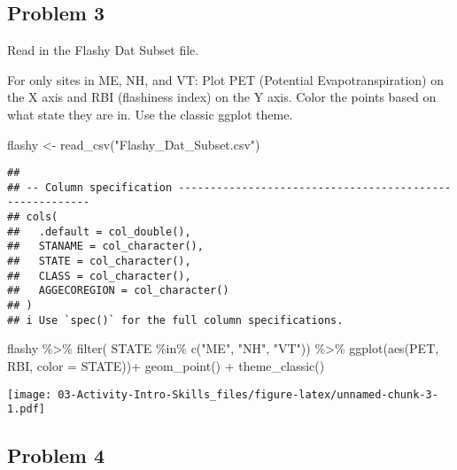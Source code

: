 \documentclass[
]{article}
\newenvironment{Shaded}{\begin{snugshade}}{\end{snugshade}}
\newcommand{\AttributeTok}[1]{\textcolor[rgb]{0.77,0.63,0.00}{#1}}
\newcommand{\FunctionTok}[1]{\textcolor[rgb]{0.00,0.00,0.00}{#1}}
\newcommand{\NormalTok}[1]{#1}
\newcommand{\OtherTok}[1]{\textcolor[rgb]{0.56,0.35,0.01}{#1}}
\newcommand{\SpecialCharTok}[1]{\textcolor[rgb]{0.00,0.00,0.00}{#1}}
\newcommand{\StringTok}[1]{\textcolor[rgb]{0.31,0.60,0.02}{#1}}
\begin{document}
\hypertarget{problem-3}{%
\subsection{Problem 3}\label{problem-3}}

Read in the Flashy Dat Subset file.

For only sites in ME, NH, and VT: Plot PET (Potential
Evapotranspiration) on the X axis and RBI (flashiness index) on the Y
axis. Color the points based on what state they are in. Use the classic
ggplot theme.

\begin{Shaded}
\begin{Highlighting}[]
\NormalTok{flashy }\OtherTok{\textless{}{-}} \FunctionTok{read\_csv}\NormalTok{(}\StringTok{"Flashy\_Dat\_Subset.csv"}\NormalTok{)}
\end{Highlighting}
\end{Shaded}

\begin{verbatim}
## 
## -- Column specification --------------------------------------------------------
## cols(
##   .default = col_double(),
##   STANAME = col_character(),
##   STATE = col_character(),
##   CLASS = col_character(),
##   AGGECOREGION = col_character()
## )
## i Use `spec()` for the full column specifications.
\end{verbatim}

\begin{Shaded}
\begin{Highlighting}[]
\NormalTok{flashy }\SpecialCharTok{\%\textgreater{}\%}
  \FunctionTok{filter}\NormalTok{( STATE }\SpecialCharTok{\%in\%} \FunctionTok{c}\NormalTok{(}\StringTok{"ME"}\NormalTok{, }\StringTok{"NH"}\NormalTok{, }\StringTok{"VT"}\NormalTok{)) }\SpecialCharTok{\%\textgreater{}\%}
  \FunctionTok{ggplot}\NormalTok{(}\FunctionTok{aes}\NormalTok{(PET, RBI, }\AttributeTok{color =}\NormalTok{ STATE))}\SpecialCharTok{+}
  \FunctionTok{geom\_point}\NormalTok{() }\SpecialCharTok{+}
  \FunctionTok{theme\_classic}\NormalTok{()}
\end{Highlighting}
\end{Shaded}

\texttt{[image: 03-Activity-Intro-Skills\_files/figure-latex/unnamed-chunk-3-1.pdf]}

\hypertarget{problem-4}{%
\subsection{Problem 4}\label{problem-4}}
\end{document}
